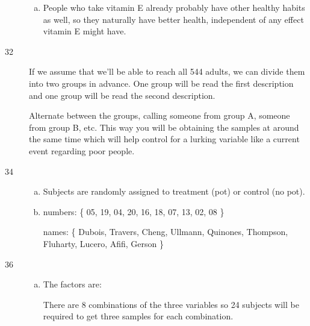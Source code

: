 \documentclass[letterpaper, landscape]{exam}
\begin{document}
\begin{description}
\begin{enumerate}[(a)]
          \item People who take vitamin E already probably have other healthy
            habits as well, so they naturally have better health, independent of
            any effect vitamin E might have.
        \end{enumerate}

      \item[32] If we assume that we'll be able to reach all 544 adults, we can
        divide them into two groups in advance.  One group will be read the
        first description and one group will be read the second description.

        Alternate between the groups, calling someone from group A, someone from
        group B, etc. This way you will be obtaining the samples at around the
        same time which will help control for a lurking variable like a current
        event regarding poor people.
        
      \item[34]
        \begin{enumerate}[(a)]
          \item Subjects are randomly assigned to treatment (pot) or control (no
            pot).

          \item numbers: \{ 05, 19, 04, 20, 16, 18, 07, 13, 02, 08 \}

            names: \{ Dubois, Travers, Cheng, Ullmann, Quinones, Thompson, Fluharty,
            Lucero, Afifi, Gerson \}

        \end{enumerate}

      \item[36]
        \begin{enumerate}[(a)]
          \item The factors are:

           There are 8 combinations of the three variables so 24 subjects
           will be required to get three samples for each combination.


\end{enumerate}
\end{description}
\end{document}
